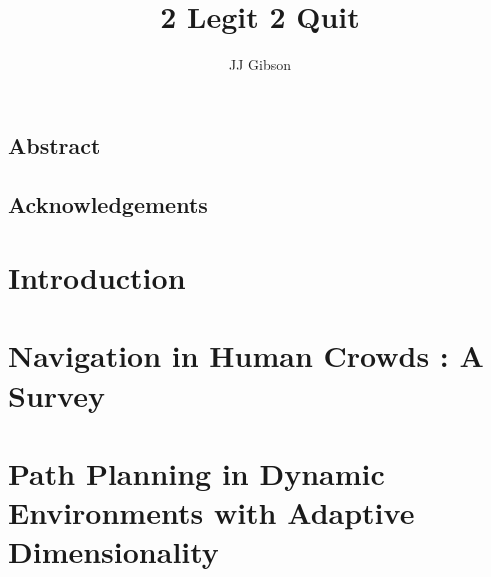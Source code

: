 \documentclass[twoside,10pt]{report}
\newcommand*\NewPage{\newpage\null\thispagestyle{empty}\newpage}
\begin{document}


\title{2 Legit 2 Quit}
\author{JJ Gibson}



\clearpage



\setcounter{page}{1}
\NewPage
\begin{centering} \section*{Abstract} \end{centering}


\NewPage

\begin{centering} \section*{Acknowledgements} \end{centering}


\NewPage


\tableofcontents
\clearpage

\NewPage


\setcounter{page}{1}


\chapter{Introduction}
\label{chap:introduction}


\clearpage

\chapter{Navigation in Human Crowds : A Survey}
\label{chap:survey}


\clearpage

\chapter{Path Planning in Dynamic Environments with Adaptive Dimensionality}
\label{chap:ppad}

\end{document}
